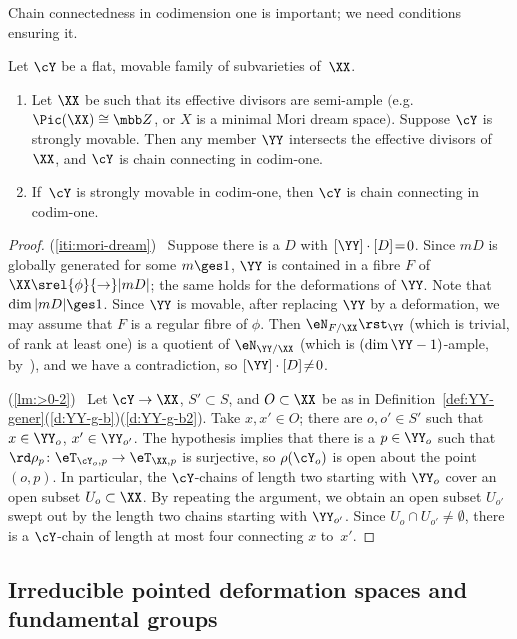 Chain connectedness in codimension one is important; we need conditions ensuring it. 

\begin{m-lemma}\label{lm:>0} 
Let $\cY$ be a flat, movable family of subvarieties of\, $\XX$. 
\begin{enumerate}
\item\label{iti:mori-dream} 
  Let $\XX$ be such that its effective divisors are semi-ample $($e.g.\  $\Pic(\XX)\cong\mbb Z$, or $X$ is a minimal Mori dream space$)$. Suppose $\cY$ is strongly movable. Then any member $\YY$ intersects the effective divisors of\, $\XX$, and $\cY$ is chain connecting in codim-one. 
\item \label{lm:>0-2}
If\, $\cY$ is strongly movable in codim-one, then $\cY$ is chain connecting in codim-one. 
\end{enumerate}
\end{m-lemma}

\begin{proof}
(\ref{iti:mori-dream})~ Suppose there is a $D$ with $[\YY]\cdot[D]\!=\!0$. Since $mD$ is globally generated for some $m\ges1$, $\YY$ is contained in a fibre $F$ of $\XX\srel{\phi}{\to}|mD|$; the same holds for the deformations of $\YY$. Note that $\dim |mD|\ges1$. 
Since $\YY$ is movable, after replacing $\YY$ by a deformation, we may assume that $F$ is a regular fibre of $\phi$. Then $\eN_{F/\XX}\rst_\YY$ (which is trivial, of rank at least one) is a quotient of $\eN_{\YY/\XX}$ (which is $(\dim \YY-1)$-ample, by~\cite{hlc-g2}), and we have a contradiction, so $[\YY]\cdot[D]\!\neq\!0$.

(\ref{lm:>0-2})~ Let $\cY\to\XX$, $S'\subset S$, and $O\subset \XX$ be as in Definition~\ref{def:YY-gener}(\ref{d:YY-g-b})(\ref{d:YY-g-b2}). Take $x, x'\in O$; there are $o,o' \in S'$ such that $x\in\YY_o$, $x'\in\YY_{o'}$. The hypothesis implies that there is a $p\in\YY_o$ such that $\rd\rho_p\colon \eT_{\cY_o,p}\to\eT_{\XX,p}$ is surjective, so $\rho(\cY_o)$ is open about the point $(o,p)$. In particular, the $\cY$-chains of length two starting with $\YY_o$ cover an open subset $U_o\subset\XX$. By repeating the argument, we obtain an open subset $U_{o'}$ swept out by the length two chains starting with $\YY_{o'}$. Since $U_o\cap U_{o'}\neq\emptyset$, there is a $\cY$-chain of length at most four connecting $x$ to~$x'$. 
\end{proof}



\subsection{Irreducible pointed deformation spaces and fundamental groups} \label{ssct:irr} 

